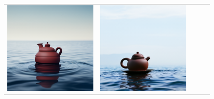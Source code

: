 \begin{figure}[!ht]
\begin{tabular}[t]{c c c c c}
    \includegraphics[width=\xwidth]{cp2/figures/dreambooth/teapot/c320_checkpoint_99.png} &
    \includegraphics[width=\xwidth]{cp2/figures/dreambooth/teapot/c512_checkpoint_499.png} \\

\end{tabular}
\end{figure}

